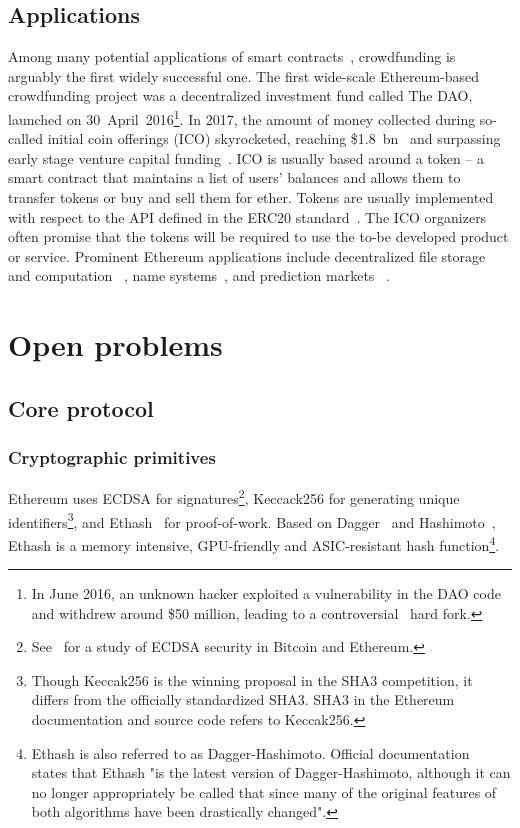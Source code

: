 \subsection{Applications}
Among many potential applications of smart contracts~\cite{McAdams2017}, crowdfunding is arguably the first widely successful one.
The first wide-scale Ethereum-based crowdfunding project was a decentralized investment fund called The DAO, launched on 30~April~2016\footnote{In June 2016, an unknown hacker exploited a vulnerability in the DAO code and withdrew around \$50 million, leading to a controversial~\cite{ETCDeclaration} hard fork.}.
In 2017, the amount of money collected during so-called initial coin offerings (ICO) skyrocketed, reaching \$1.8~bn~\cite{CoindeakICOTracker} and surpassing early stage venture capital funding~\cite{Sunnarborg2017}.
ICO is usually based around a token -- a smart contract that maintains a list of users' balances and allows them to transfer tokens or buy and sell them for ether.
Tokens are usually implemented with respect to the API defined in the ERC20 standard~\cite{Victor2019}.
The ICO organizers often promise that the tokens will be required to use the to-be developed product or service.
Prominent Ethereum applications include decentralized file storage~\cite{Filecoin} \cite{Sia} \cite{Storj} and computation~\cite{Golem} \cite{Sonm}, name systems~\cite{ENS}, and prediction markets~\cite{Augur} \cite{Gnosis}.


\section{Open problems}

\subsection{Core protocol}

\subsubsection{Cryptographic primitives}
Ethereum uses ECDSA for signatures\footnote{See~\cite{Mayer2016} for a study of ECDSA security in Bitcoin and Ethereum.}, Keccack256 for generating unique identifiers\footnote{Though Keccak256 is the winning proposal in the SHA3 competition, it differs from the officially standardized SHA3. SHA3 in the Ethereum documentation and source code refers to Keccak256.}, and Ethash~\cite{Ethash} for proof-of-work.	
Based on Dagger~\cite{Buterin2013} and Hashimoto~\cite{Dryja2014}, Ethash is a memory intensive, GPU-friendly and ASIC-resistant hash function\footnote{Ethash is also referred to as Dagger-Hashimoto. Official documentation~\cite{Ethash} states that Ethash "is the latest version of Dagger-Hashimoto, although it can no longer appropriately be called that since many of the original features of both algorithms have been drastically changed".}.

